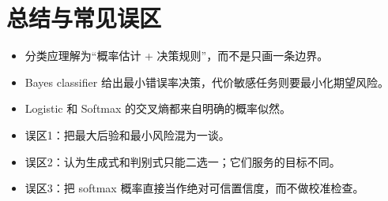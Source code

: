 ﻿\documentclass[11pt]{article}
\begin{document}
\section{总结与常见误区}
\begin{itemize}[leftmargin=1.6em]
  \item 分类应理解为“概率估计 + 决策规则”，而不是只画一条边界。
  \item Bayes classifier 给出最小错误率决策，代价敏感任务则要最小化期望风险。
  \item Logistic 和 Softmax 的交叉熵都来自明确的概率似然。
  \item 误区1：把最大后验和最小风险混为一谈。
  \item 误区2：认为生成式和判别式只能二选一；它们服务的目标不同。
  \item 误区3：把 softmax 概率直接当作绝对可信置信度，而不做校准检查。
\end{itemize}
\end{document}
